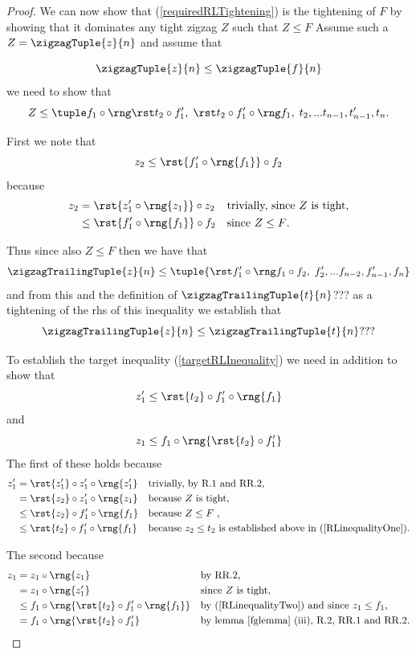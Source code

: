{\begin{proof}
We can now show that (\ref{requiredRLTightening})
is the tightening of $F$ by showing that 
it dominates any tight zigzag $Z$ such that
$Z \leq F$ 
Assume such a $Z=\zigzagTuple{z}{n}$ and assume that

\[
\zigzagTuple{z}{n} \leq \zigzagTuple{f}{n}
\]
we need to show that 
\begin{equation}
\label{targetRLInequality}
Z \leq \requiredRLTightening.
\end{equation}

First we note that  
\[
 z_2 \leq \rst{f'_1 \circ \rng{f_1}} \circ f_2
\]
because 
\begin{align*}
z_2 &= \rst{z'_1 \circ \rng{z_1}} \circ z_2 
          && \mbox{trivially, since $Z$ is tight,}\\
    &\leq \rst{f'_1 \circ \rng{f_1}} \circ f_2 
     &&\mbox{\parbox{3cm}{since $Z \leq F$.}}
\end{align*}

Thus since also $Z \leq F$ then we have that
\[
\zigzagTrailingTuple{z}{n} \leq \tuple{\tightTail}
\] 
and from this and the definition of $\zigzagTrailingTuple{t}{n}$???
as a tightening of the rhs of this inequality we establish that
\[
\label{RLinequalityOne}
\zigzagTrailingTuple{z}{n} \leq \zigzagTrailingTuple{t}{n} ???
\]

To establish the target inequality (\ref{targetRLInequality})
we need 
in addition to show that
 \begin{equation}
 \label{RLinequalityTwo}
 z'_1 \leq  \rst{t_2} \circ f'_1 \circ \rng{f_1}
 \end{equation}
 and
  \begin{equation}
 \label{RLinequalityThree}
 z_1 \leq f_1 \circ \rng{\rst{t_2} \circ f'_1}
 \end{equation}
The first of these holds because
\begin{align*}
z'_1 &= \rst{z'_1} \circ z'_1  \circ \rng{z'_1} 
                && \mbox{trivially, by R.1 and RR.2,}\\
         &= \rst{z_2} \circ z'_1  \circ \rng{z_1} 
         &&\mbox{because $Z$ is tight,}\\
         &\leq \rst{z_2} \circ f'_1  \circ \rng{f_1}
         &&\mbox{because $Z \leq F$ ,}\\
         &\leq \rst{t_2} \circ f'_1  \circ \rng{f_1}
         &&\mbox{because $z_2 \leq t_2$ is established
                               above in (\ref{RLinequalityOne}).}
\end{align*}

The second because
\begin{align*}
z_1 &= z_1 \circ \rng{z_1}
        && \mbox{by RR.2,} \\ 
    &= z_1 \circ \rng{z'_1}
        && \mbox{since $Z$ is tight,} \\ 
    &\leq f_1 \circ \rng{\rst{t_2} \circ f'_1 \circ \rng{f_1}}
        && \mbox{by (\ref{RLinequalityTwo}) and since $z_1 \leq f_1$,} \\ 
    &= f_1 \circ \rng{\rst{t_2} \circ f'_1}
        && \mbox{by lemma \ref{fglemma} (iii), R.2, RR.1  and RR.2.}
\end{align*}
\end{proof}
}  %

